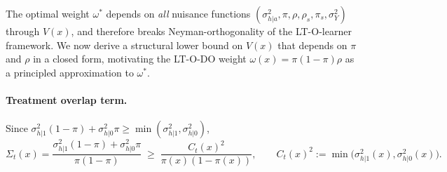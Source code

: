 \documentclass{article}
\theoremstyle{plain}
\theoremstyle{definition}
\theoremstyle{remark}
\newcommand{\1}{\mathds{1}}                %
\begin{document}
The optimal weight $\omega^*$ depends on \emph{all} nuisance functions
$(\sigma^2_{h|a}, \pi, \rho, \rho_s, \pi_s, \sigma^2_Y)$ through $V(x)$, and therefore
breaks Neyman-orthogonality of the LT-O-learner framework. We now derive a structural
lower bound on $V(x)$ that depends on $\pi$ and $\rho$ in a closed form, motivating the
LT-O-DO weight $\omega(x) = \pi(1-\pi)\rho$ as a principled approximation to $\omega^*$.

\paragraph{Treatment overlap term.}
Since $\sigma^2_{h|1}(1-\pi) + \sigma^2_{h|0}\pi \geq \min(\sigma^2_{h|1}, \sigma^2_{h|0})$,
\begin{equation}
\Sigma_t(x) = \frac{\sigma^2_{h|1}(1-\pi) + \sigma^2_{h|0}\pi}{\pi(1-\pi)}
\;\geq\; \frac{C_t(x)^2}{\pi(x)(1-\pi(x))},
\qquad
C_t(x)^2 := \min\!\big(\sigma^2_{h|1}(x), \sigma^2_{h|0}(x)\big).
\label{eq:Sigma_t_bound}
\end{equation}
\end{document}

